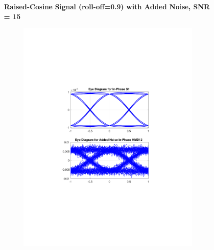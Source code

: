 \begin{figure}[H]
		\centering
	\textbf{Raised-Cosine Signal (roll-off=0.9) with Added Noise, SNR = 15}
	\begin{minipage}{\linewidth}
		\centering
	\begin{subfigure}{.45\textwidth}
		\centering
		\includegraphics[clip, trim=5cm 7cm 5cm 7cm, width=\textwidth]{./sdf/m_qam_system/figures/eyes/if_n_nmf_45_60_rc_09.pdf}
	\end{subfigure}
	\begin{subfigure}{.45\textwidth}
		\centering

\end{subfigure}
\end{minipage}
\end{figure}
